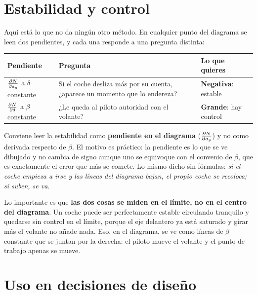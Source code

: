\section{Estabilidad y control}
\label{sec:diagramas_ymd:03}

Aquí está lo que no da ningún otro método. En cualquier punto del diagrama se
leen dos pendientes, y cada una responde a una pregunta distinta:

\begin{center}
\begin{tabularx}{\textwidth}{@{}lXX@{}}
\toprule
\textbf{Pendiente} & \textbf{Pregunta} & \textbf{Lo que quieres} \\
\midrule
$\frac{\partial N}{\partial a_y}$ a $\delta$ constante & Si el coche desliza más por su cuenta, ¿aparece un momento que lo endereza? & \textbf{Negativa}: estable \\
$\frac{\partial N}{\partial \delta}$ a $\beta$ constante & ¿Le queda al piloto autoridad con el volante? & \textbf{Grande}: hay control \\
\bottomrule
\end{tabularx}
\end{center}

\begin{clave}
Conviene leer la estabilidad como \textbf{pendiente en el diagrama}
($\frac{\partial N}{\partial a_y}$) y no como derivada respecto de $\beta$. El motivo es
práctico: la pendiente es lo que se ve dibujado y no cambia de signo aunque uno
se equivoque con el convenio de $\beta$, que es exactamente el error que más se
comete. Lo mismo dicho sin fórmulas: \emph{si el coche empieza a irse y las
líneas del diagrama bajan, el propio coche se recoloca; si suben, se va}.
\end{clave}

Lo importante es que \textbf{las dos cosas se miden en el límite, no en el
centro del diagrama}. Un coche puede ser perfectamente estable circulando
tranquilo y quedarse sin control en el límite, porque el eje delantero ya está
saturado y girar más el volante no añade nada. Eso, en el diagrama, se ve como
líneas de $\beta$ constante que se juntan por la derecha: el piloto mueve el
volante y el punto de trabajo apenas se mueve.

\section{Uso en decisiones de diseño}
\label{sec:diagramas_ymd:04}

